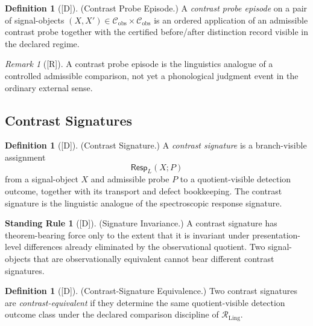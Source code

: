 \documentclass[12pt,oneside]{amsbook}
\theoremstyle{plain}
\theoremstyle{definition}
\newtheorem{definition}[theorem]{Definition}
\newtheorem{standingrule}[theorem]{Standing Rule}
\theoremstyle{remark}
\newtheorem{remark}[theorem]{Remark}
\newcommand{\status}[1]{\textup{[#1]}}
\begin{document}
\begin{definition}[\status{D}]\label{def:ling-probe-episode}
\textup{(Contrast Probe Episode.)}
A \emph{contrast probe episode} on a pair of signal-objects
$(X, X') \in \mathcal{C}_{\mathrm{obs}} \times \mathcal{C}_{\mathrm{obs}}$
is an ordered application of an admissible contrast probe together with
the certified before/after distinction record visible in the declared
regime.
\end{definition}

\begin{remark}[\status{R}]\label{rem:ling-probe-episode-note}
A contrast probe episode is the linguistics analogue of a controlled
admissible comparison, not yet a phonological judgment event in the
ordinary external sense.
\end{remark}

\subsection{Contrast Signatures}\label{sec:ling-contrast-signatures}

\begin{definition}[\status{D}]\label{def:ling-contrast-signature}
\textup{(Contrast Signature.)}
A \emph{contrast signature} is a branch-visible assignment
\[
 \mathsf{Resp}_{L}(X; P)
\]
from a signal-object $X$ and admissible probe $P$ to a quotient-visible
detection outcome, together with its transport and defect bookkeeping.
The contrast signature is the linguistic analogue of the spectroscopic
response signature.
\end{definition}

\begin{standingrule}[\status{D}]\label{sr:ling-signature-invariance}
\textup{(Signature Invariance.)}
A contrast signature has theorem-bearing force only to the extent that
it is invariant under presentation-level differences already eliminated
by the observational quotient. Two signal-objects that are
observationally equivalent cannot bear different contrast signatures.
\end{standingrule}

\begin{definition}[\status{D}]\label{def:ling-contrast-equiv-signature}
\textup{(Contrast-Signature Equivalence.)}
Two contrast signatures are \emph{contrast-equivalent} if they
determine the same quotient-visible detection outcome class under the
declared comparison discipline of $\mathcal{R}_{\mathrm{Ling}}$.
\end{definition}
\end{document}
